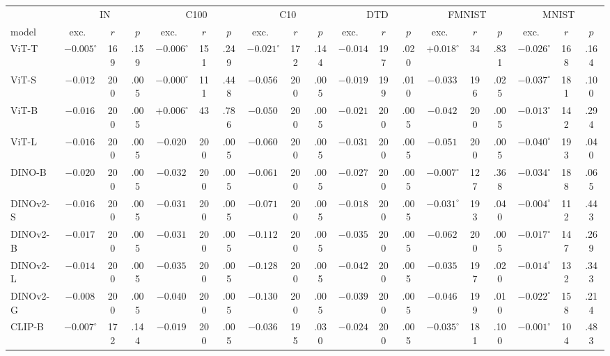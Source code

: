 \begin{table}[H]
\centering
\scriptsize
\setlength{\tabcolsep}{1.4pt}
\begin{tabular}{lcccccccccccccccccc}
\toprule
 & \multicolumn{3}{c}{IN} & \multicolumn{3}{c}{C100} & \multicolumn{3}{c}{C10} & \multicolumn{3}{c}{DTD} & \multicolumn{3}{c}{FMNIST} & \multicolumn{3}{c}{MNIST} \\
model & exc.\ & $r$ & $p$ & exc.\ & $r$ & $p$ & exc.\ & $r$ & $p$ & exc.\ & $r$ & $p$ & exc.\ & $r$ & $p$ & exc.\ & $r$ & $p$ \\
\midrule
ViT-T & $-0.005^{\circ}$ & 169 & .159 & $-0.006^{\circ}$ & 151 & .249 & $-0.021^{\circ}$ & 172 & .144 & $-0.014$ & 197 & .020 & $+0.018^{\circ}$ & 34 & .831 & $-0.026^{\circ}$ & 168 & .164 \\
ViT-S & $-0.012$ & 200 & .005 & $-0.000^{\circ}$ & 111 & .448 & $-0.056$ & 200 & .005 & $-0.019$ & 199 & .010 & $-0.033$ & 196 & .025 & $-0.037^{\circ}$ & 181 & .100 \\
ViT-B & $-0.016$ & 200 & .005 & $+0.006^{\circ}$ & 43 & .786 & $-0.050$ & 200 & .005 & $-0.021$ & 200 & .005 & $-0.042$ & 200 & .005 & $-0.013^{\circ}$ & 142 & .294 \\
ViT-L & $-0.016$ & 200 & .005 & $-0.020$ & 200 & .005 & $-0.060$ & 200 & .005 & $-0.031$ & 200 & .005 & $-0.051$ & 200 & .005 & $-0.040^{\circ}$ & 193 & .040 \\
\midrule
DINO-B & $-0.020$ & 200 & .005 & $-0.032$ & 200 & .005 & $-0.061$ & 200 & .005 & $-0.027$ & 200 & .005 & $-0.007^{\circ}$ & 127 & .368 & $-0.034^{\circ}$ & 188 & .065 \\
DINOv2-S & $-0.016$ & 200 & .005 & $-0.031$ & 200 & .005 & $-0.071$ & 200 & .005 & $-0.018$ & 200 & .005 & $-0.031^{\circ}$ & 193 & .040 & $-0.004^{\circ}$ & 112 & .443 \\
DINOv2-B & $-0.017$ & 200 & .005 & $-0.031$ & 200 & .005 & $-0.112$ & 200 & .005 & $-0.035$ & 200 & .005 & $-0.062$ & 200 & .005 & $-0.017^{\circ}$ & 147 & .269 \\
DINOv2-L & $-0.014$ & 200 & .005 & $-0.035$ & 200 & .005 & $-0.128$ & 200 & .005 & $-0.042$ & 200 & .005 & $-0.035$ & 197 & .020 & $-0.014^{\circ}$ & 132 & .343 \\
DINOv2-G & $-0.008$ & 200 & .005 & $-0.040$ & 200 & .005 & $-0.130$ & 200 & .005 & $-0.039$ & 200 & .005 & $-0.046$ & 199 & .010 & $-0.022^{\circ}$ & 158 & .214 \\
\midrule
CLIP-B & $-0.007^{\circ}$ & 172 & .144 & $-0.019$ & 200 & .005 & $-0.036$ & 195 & .030 & $-0.024$ & 200 & .005 & $-0.035^{\circ}$ & 181 & .100 & $-0.001^{\circ}$ & 104 & .483 \\

\end{tabular}
\end{table}
